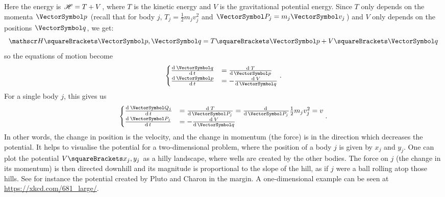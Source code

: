 \documentclass[10pt, a4paper, twoside]{basestyle}
\begin{document}
Here the energy is $\mathscr{H} = T + V$, where $T$ is the kinetic energy
and $V$ is the gravitational potential energy.
Since $T$ only depends on the momenta $\vp$ (recall that for body $j$,
$T_j = \frac{1}{2} m_j v_j^2$ and $\vP_j = m_j\vv_j$) and $V$ only depends
on the positions $\vq$, we get:
\[
\Hamiltonian\of{\vp, \vq} = T\of{\vp} + V\of{\vq}
\]
so the equations of motion become
\[
\begin{cases}
\deriv t {\vq} &= \deriv {\vp} T \\
\deriv t {\vp} &= -\deriv {\vq} V
\end{cases}.
\]
For a single body $j$, this gives us
\[
\begin{cases}
\deriv t {\vQ_j} &= \deriv {\vP_j} T = \derivop {\vP_j}\frac{1}{2} m_j v_j^2
    = v \\
\deriv t {\vP_j} &= -\deriv {\vq} V
\end{cases}.
\]
In other words, the change in position is the velocity, and the change in
momentum (the force) is in the direction which decreases the potential.
It helps to visualise the potential for a two-dimensional problem, where the
position of a body $j$ is given by $x_j$ and $y_j$. One can plot the potential
$V\of{x_j, y_j}$ as a hilly landscape, where wells are created by the other
bodies. The force on $j$ (the change in its momentum) is then directed downhill
and its magnitude is proportional to the slope of the hill, as if $j$ were a
ball rolling atop those hills.
See for instance the potential created by Pluto and Charon in the margin.
A one-dimensional example can be seen at \url{https://xkcd.com/681_large/}.
\end{document}
